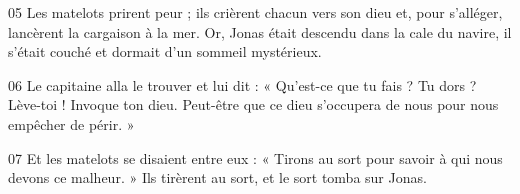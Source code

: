 
05 Les matelots prirent peur ; ils crièrent chacun vers son dieu et, pour s’alléger, lancèrent la cargaison à la mer. Or, Jonas était descendu dans la cale du navire, il s’était couché et dormait d’un sommeil mystérieux.

06 Le capitaine alla le trouver et lui dit : « Qu’est-ce que tu fais ? Tu dors ? Lève-toi ! Invoque ton dieu. Peut-être que ce dieu s’occupera de nous pour nous empêcher de périr. »

07 Et les matelots se disaient entre eux : « Tirons au sort pour savoir à qui nous devons ce malheur. » Ils tirèrent au sort, et le sort tomba sur Jonas.
